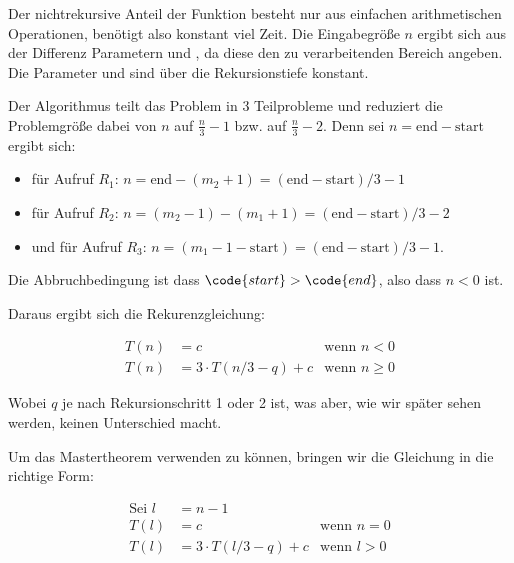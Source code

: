\documentclass[parskip=half,a4paper]{scrartcl}
\begin{document}
Der nichtrekursive Anteil der Funktion besteht nur aus einfachen arithmetischen Operationen, benötigt also konstant  viel Zeit. Die Eingabegröße $n$ ergibt sich aus der Differenz Parametern  und , da diese den zu verarbeitenden Bereich angeben. Die Parameter  und  sind über die Rekursionstiefe konstant.

Der Algorithmus teilt das Problem in 3 Teilprobleme und reduziert die Problemgröße dabei von $n$ auf $\frac{n}{3} - 1$ bzw. auf $\frac{n}{3} - 2$. Denn sei $n = \text{end} - \text{start}$ ergibt sich:
\begin{itemize}
	\item für Aufruf $R_1$: $n = \text{end} - \left(m_2 + 1\right) = \left(\text{end} -
	\text{start}\right) / 3 - 1$

	\item für Aufruf $R_2$: $n = \left(m_2 - 1\right) - \left(m_1 + 1\right) = \left(\text{end} - \text{start}\right) / 3 - 2$
	\item und für Aufruf $R_3$: $n = \left(m_1 - 1 - \text{start}\right) = \left(\text{end} - \text{start}\right) / 3 - 1$.
\end{itemize}

Die Abbruchbedingung ist dass $\code{start} > \code{end}$, also dass $n < 0$ ist.

Daraus ergibt sich die Rekurenzgleichung:

\begin{equation}
\begin{aligned}
T\left(n\right) & = c & \text{wenn $n < 0$}\\
T\left(n\right) & = 3 \cdot T\left(n / 3 - q\right) + c & \text{wenn $n \ge 0$}
\end{aligned}
\end{equation}

Wobei $q$ je nach Rekursionschritt 1 oder 2 ist, was aber, wie wir später sehen werden, keinen Unterschied macht.

Um das Mastertheorem verwenden zu können, bringen wir die Gleichung in die richtige Form:


\begin{equation}
\begin{aligned}
\text{Sei $l$} & = n - 1&\\
T\left(l\right) & = c & \text{wenn $n = 0$}  \\
T\left(l\right) & = 3 \cdot T\left(l / 3 - q\right) + c & \text{wenn $l > 0$}
\end{aligned}
\end{equation}
\end{document}
